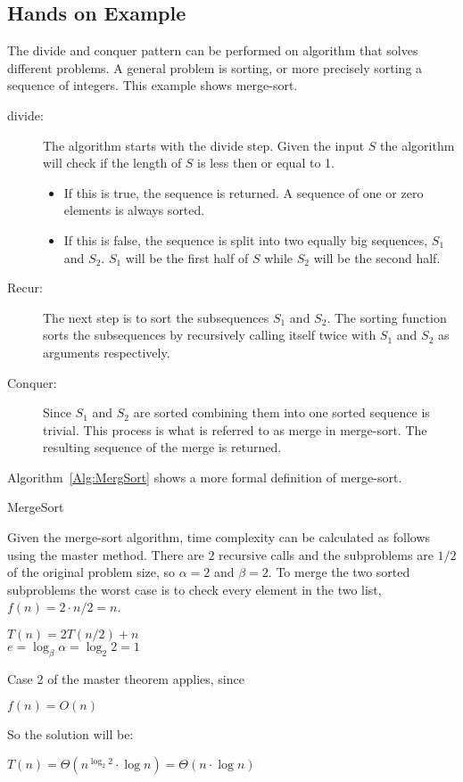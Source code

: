 \subsection{Hands on Example}
The divide and conquer pattern can be performed on algorithm that solves
different problems. A general problem is sorting, or more precisely sorting a
sequence of integers. This example shows merge-sort.

\begin{description}
\item[divide:] The algorithm starts with the divide step. Given the input $S$
the algorithm will check if the length of $S$ is less then or equal to 1.
\begin{itemize}
\item If this is true, the sequence is returned. A sequence of one or zero
elements is always sorted.
\item If this is false, the sequence is split into two equally big sequences,
$S_1$ and $S_2$. $S_1$ will be the first half of $S$ while $S_2$ will be the
second half.
\end{itemize}
\item[Recur:] The next step is to sort the subsequences $S_1$ and $S_2$. The
sorting function sorts the subsequences by recursively calling itself twice with
$S_1$ and $S_2$ as arguments respectively.
\item[Conquer:] Since $S_1$ and $S_2$ are sorted combining them into one sorted
sequence is trivial. This process is what is referred to as merge in merge-sort.
The resulting sequence of the merge is returned.
\end{description}
Algorithm~\ref{Alg:MergSort} shows a more formal definition of merge-sort.

\begin{algorithm}
\DontPrintSemicolon
{}
\caption{MergeSort}
\label{Alg:MergSort}
\end{algorithm}

Given the merge-sort algorithm, time complexity can be calculated as follows
using the master method. There are $2$ recursive calls and the subproblems are
$1/2$ of the original problem size, so $\alpha=2$ and $\beta=2$. To merge the
two sorted subproblems the worst case is to check every element in the two list,
$f(n) = 2 \cdot n/2 = n$.
\begin{center}
$T(n) = 2T(n/2) + n$\\
$e=\log_\beta\alpha=\log_2 2=1$
\end{center}
Case 2 of the master theorem applies, since
\begin{center}
$f(n) = O(n)$
\end{center}
So the solution will be:
\begin{center}
$T(n) = \Theta(n^{\log_2 2} \cdot \log n) = \Theta(n \cdot \log n)$
\end{center}

